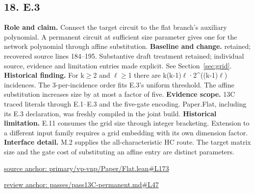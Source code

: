 \documentclass[11pt,letterpaper]{article}
\theoremstyle{definition}\newtheorem{definition}[theorem]{Definition}\newtheorem{example}[theorem]{Example}
\theoremstyle{remark}\newtheorem{remark}[theorem]{Remark}
\begin{document}
\subsection*{18. E.3}
\textbf{Role and claim.} Connect the target circuit to the flat branch's auxiliary polynomial. A permanent circuit at sufficient size parameter gives one for the network polynomial through affine substitution.
\textbf{Baseline and change.} retained; recovered source lines 184--195. Substantive draft treatment retained; individual source, evidence and limitation entries made explicit. See Section~\ref{sec:grid}.
\textbf{Historical finding.} For k\ensuremath{\ge}2 and \ensuremath{\ell}\ensuremath{\ge}1 there are k(k-1)\ensuremath{\ell}·2\textasciicircum{}((k-1)\ensuremath{\ell}) incidences. The 3-per-incidence order fits E.3's uniform threshold. The affine substitution increases size by at most a factor of five.
\textbf{Evidence scope.} 13C traced literals through E.1–E.3 and the five-gate encoding. Paper.Flat, including its E.3 declaration, was freshly compiled in the joint build.
\textbf{Historical limitation.} E.11 consumes the grid size through integer bracketing. Extension to a different input family requires a grid embedding with its own dimension factor.
\textbf{Interface detail.} M.2 supplies the all-characteristic HC route. The target matrix size and the gate cost of substituting an affine entry are distinct parameters.
\par\href{https://github.com/nousentllc/VP-VNP-Review/blob/8a7976933b6b2b4ffda1ad3a0dfb5fc6b6f023e8/primary/vp-vnp/Paper/Flat.lean\#L173}{source anchor: primary/vp-vnp/Paper/Flat.lean\#L173}
\par\href{https://github.com/nousentllc/VP-VNP-Review/blob/8a7976933b6b2b4ffda1ad3a0dfb5fc6b6f023e8/passes/pass13C-permanent.md\#L47}{review anchor: passes/pass13C-permanent.md\#L47}
\goodbreak
\end{document}
